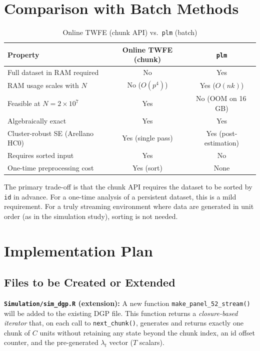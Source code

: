 \documentclass[11pt, a4paper]{article}
\begin{document}
\section{Comparison with Batch Methods}

\begin{table}[h]
  \centering
  \caption{Online TWFE (chunk API) vs.\ \texttt{plm} (batch)}
  \begin{tabular}{lcc}
    \toprule
    Property & Online TWFE (chunk) & \texttt{plm} \\
    \midrule
    Full dataset in RAM required      & No  & Yes \\
    RAM usage scales with $N$         & No ($O(p^4)$) & Yes ($O(nk)$) \\
    Feasible at $N = 2 \times 10^7$   & Yes & No (OOM on 16\,GB) \\
    Algebraically exact               & Yes & Yes \\
    Cluster-robust SE (Arellano HC0)  & Yes (single pass) & Yes (post-estimation) \\
    Requires sorted input             & Yes & No \\
    One-time preprocessing cost       & Yes (sort) & None \\
    \bottomrule
  \end{tabular}
\end{table}

The primary trade-off is that the chunk API requires the dataset to be sorted
by \texttt{id} in advance.  For a one-time analysis of a persistent dataset,
this is a mild requirement.  For a truly streaming environment where data are
generated in unit order (as in the simulation study), sorting is not needed.

\section{Implementation Plan}

\subsection{Files to be Created or Extended}

\textbf{\texttt{Simulation/sim\_dgp.R} (extension):}
A new function \texttt{make\_panel\_52\_stream()} will be added to the
existing DGP file.  This function returns a \emph{closure-based iterator} that,
on each call to \texttt{next\_chunk()}, generates and returns exactly one chunk
of $C$ units without retaining any state beyond the chunk index, an id offset
counter, and the pre-generated $\lambda_t$ vector ($T$ scalars).
\end{document}
